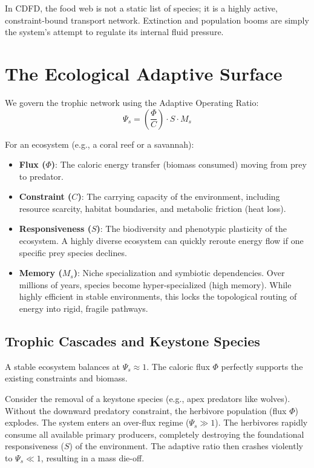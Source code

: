 \documentclass[11pt,a4paper]{article}
\begin{document}
In CDFD, the food web is not a static list of species; it is a highly active, constraint-bound transport network. Extinction and population booms are simply the system's attempt to regulate its internal fluid pressure.

\section{The Ecological Adaptive Surface}
We govern the trophic network using the Adaptive Operating Ratio:
\begin{equation}
    \Psi_s = \left( \frac{\Phi}{C} \right) \cdot S \cdot M_s
\end{equation}

For an ecosystem (e.g., a coral reef or a savannah):
\begin{itemize}
    \item \textbf{Flux ($\Phi$)}: The caloric energy transfer (biomass consumed) moving from prey to predator.
    \item \textbf{Constraint ($C$)}: The carrying capacity of the environment, including resource scarcity, habitat boundaries, and metabolic friction (heat loss).
    \item \textbf{Responsiveness ($S$)}: The biodiversity and phenotypic plasticity of the ecosystem. A highly diverse ecosystem can quickly reroute energy flow if one specific prey species declines.
    \item \textbf{Memory ($M_s$)}: Niche specialization and symbiotic dependencies. Over millions of years, species become hyper-specialized (high memory). While highly efficient in stable environments, this locks the topological routing of energy into rigid, fragile pathways.
\end{itemize}

\subsection{Trophic Cascades and Keystone Species}
A stable ecosystem balances at $\Psi_s \approx 1$. The caloric flux $\Phi$ perfectly supports the existing constraints and biomass.

Consider the removal of a keystone species (e.g., apex predators like wolves). Without the downward predatory constraint, the herbivore population (flux $\Phi$) explodes. The system enters an over-flux regime ($\Psi_s \gg 1$). The herbivores rapidly consume all available primary producers, completely destroying the foundational responsiveness ($S$) of the environment. The adaptive ratio then crashes violently to $\Psi_s \ll 1$, resulting in a mass die-off.
\end{document}
